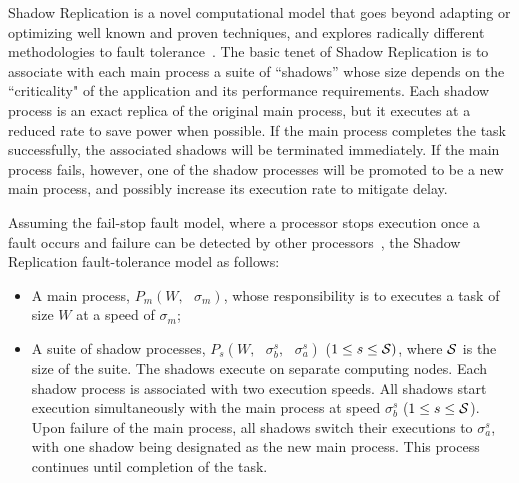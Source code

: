 
Shadow Replication is a novel computational model that goes beyond adapting or optimizing well known and proven techniques, and explores radically different methodologies to fault tolerance~\cite{mills_2014_icnc,mills_2014_pdp,mills2014power}. %
The basic tenet of Shadow Replication is to associate with each main process a suite of “shadows” whose size depends on the 
``criticality" of the application and its performance requirements. Each shadow process is an exact replica of the original 
main process, but it executes at a reduced rate to save power when possible.
If the main process completes the task successfully, the associated shadows will be terminated immediately. If the main process fails, however, one of the shadow processes will be promoted to be a 
new main process, and possibly increase its execution rate to mitigate delay.

Assuming the fail-stop fault model, where a processor stops execution once a fault
occurs and failure can be detected by other processors~\cite{gartner_faults_1999,cristian_comm_1991}, 
the Shadow Replication fault-tolerance model as follows:
\begin{itemize}
	\item A main process, $P_m(W,\text{ }\sigma_m)$, whose responsibility is to executes a task of size $W$ at a speed of $\sigma_m$;
	\item A suite of shadow processes, $P_{s}(W,\text{ }\sigma_b^s, \text{ }\sigma_a^s)$ ($1 \le s \le \cal S)$, where $\cal S$ is the size of the suite. The shadows execute on separate computing nodes. Each shadow process is associated with two execution speeds. All shadows start execution simultaneously with the main process at speed $\sigma_b^s$ ($1 \le s \le \cal S$). Upon failure of the main process, all shadows switch their executions to $\sigma_a^s$, with one shadow being designated as the new main process. This process continues until completion of the task.
\end{itemize}

